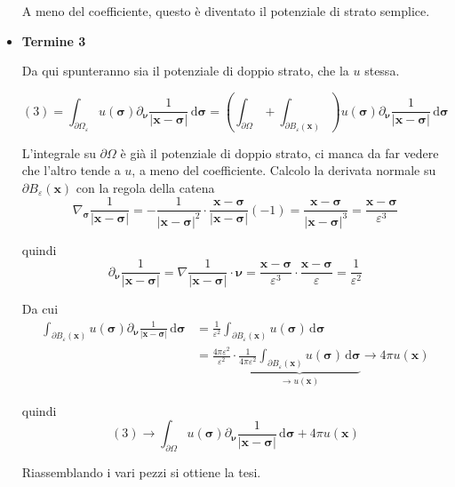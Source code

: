 \documentclass[10pt,a4paper,twoside,openright]{book}
\newcommand{\x}{\mathbf{x}}
\newcommand{\sigg}{\bm{\sigma}}
\newcommand{\nuu}{\bm{\nu}}
\newcommand{\de}{\,\mathrm d}
\newcommand{\dsig}{\de \sigg}
\begin{document}
\begin{dimostrazione}
\begin{itemize}
	A meno del coefficiente, questo è diventato il potenziale di strato semplice.
	\item \textbf{Termine 3}

	Da qui spunteranno sia il potenziale di doppio strato, che la $u$ stessa.

	\begin{equation*}
	(3) =\int _{\partial \Omega _{\varepsilon }} u(\sigg) \partial _{\nuu}\frac{1}{| \x -\sigg| } \dsig =\left(\int _{\partial \Omega } +\int _{\partial B_{\varepsilon }(\x)}\right) u(\sigg) \partial _{\nuu}\frac{1}{| \x -\sigg| } \dsig
	\end{equation*}

	L'integrale su $\displaystyle \partial \Omega $ è già il potenziale di doppio strato, ci manca da far vedere che l'altro tende a $u$, a meno del coefficiente. Calcolo la derivata normale su $\displaystyle \partial B_{\varepsilon }(\x)$ con la regola della catena
	\begin{equation*}
	\nabla _{\sigg}\frac{1}{| \x -\sigg| } =-\frac{1}{| \x -\sigg| ^{2}} \cdotp \frac{\x -\sigg}{| \x -\sigg| }(-1) =\frac{\x -\sigg}{| \x -\sigg| ^{3}} =\frac{\x -\sigg}{\varepsilon ^{3}}
	\end{equation*}

	quindi
	\begin{equation*}
	\partial _{\nuu}\frac{1}{| \x -\sigg| } =\nabla \frac{1}{| \x -\sigg| } \cdotp \nuu =\frac{\x -\sigg}{\varepsilon ^{3}} \cdotp \frac{\x -\sigg}{\varepsilon } =\frac{1}{\varepsilon ^{2}}
	\end{equation*}

	Da cui
	\begin{align*}
	\int _{\partial B_{\varepsilon }(\x)} u(\sigg) \partial _{\nuu}\frac{1}{| \x -\sigg| } \dsig & =\frac{1}{\varepsilon ^{2}}\int _{\partial B_{\varepsilon }(\x)} u(\sigg) \dsig\\
	 & =\frac{4\pi \varepsilon ^{2}}{\varepsilon ^{2}} \cdotp \underbrace{\frac{1}{4\pi \varepsilon ^{2}}\int _{\partial B_{\varepsilon }(\x)} u(\sigg) \dsig}_{\rightarrow u(\x)}\rightarrow 4\pi u(\x)
	\end{align*}

	quindi
	\begin{equation*}
	(3)\rightarrow \int _{\partial \Omega } u(\sigg) \partial _{\nuu}\frac{1}{| \x -\sigg| } \dsig +4\pi u(\x)
	\end{equation*}

	Riassemblando i vari pezzi si ottiene la tesi.
	\end{itemize}
\end{dimostrazione}
\end{document}
